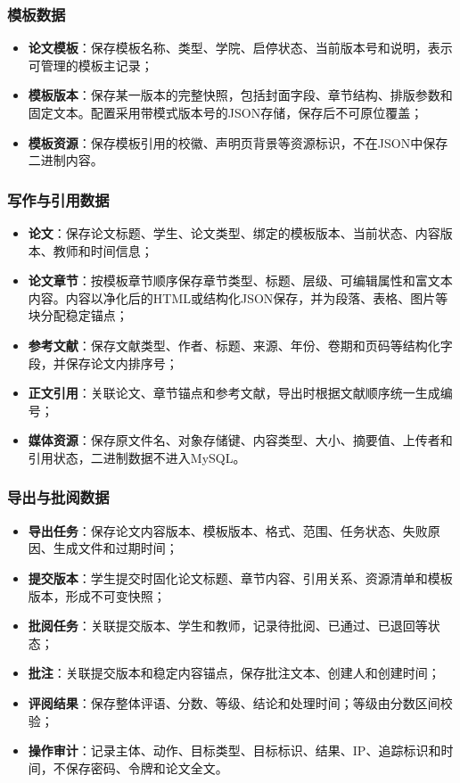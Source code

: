\documentclass{../template/softeng}
\begin{document}
	\subsubsection{模板数据}
	\begin{itemize}
		\item \textbf{论文模板}：保存模板名称、类型、学院、启停状态、当前版本号和说明，表示可管理的模板主记录；
		\item \textbf{模板版本}：保存某一版本的完整快照，包括封面字段、章节结构、排版参数和固定文本。配置采用带模式版本号的JSON存储，保存后不可原位覆盖；
		\item \textbf{模板资源}：保存模板引用的校徽、声明页背景等资源标识，不在JSON中保存二进制内容。
	\end{itemize}
	
	\subsubsection{写作与引用数据}
	\begin{itemize}
		\item \textbf{论文}：保存论文标题、学生、论文类型、绑定的模板版本、当前状态、内容版本、教师和时间信息；
		\item \textbf{论文章节}：按模板章节顺序保存章节类型、标题、层级、可编辑属性和富文本内容。内容以净化后的HTML或结构化JSON保存，并为段落、表格、图片等块分配稳定锚点；
		\item \textbf{参考文献}：保存文献类型、作者、标题、来源、年份、卷期和页码等结构化字段，并保存论文内排序号；
		\item \textbf{正文引用}：关联论文、章节锚点和参考文献，导出时根据文献顺序统一生成编号；
		\item \textbf{媒体资源}：保存原文件名、对象存储键、内容类型、大小、摘要值、上传者和引用状态，二进制数据不进入MySQL。
	\end{itemize}
	
	\subsubsection{导出与批阅数据}
	\begin{itemize}
		\item \textbf{导出任务}：保存论文内容版本、模板版本、格式、范围、任务状态、失败原因、生成文件和过期时间；
		\item \textbf{提交版本}：学生提交时固化论文标题、章节内容、引用关系、资源清单和模板版本，形成不可变快照；
		\item \textbf{批阅任务}：关联提交版本、学生和教师，记录待批阅、已通过、已退回等状态；
		\item \textbf{批注}：关联提交版本和稳定内容锚点，保存批注文本、创建人和创建时间；
		\item \textbf{评阅结果}：保存整体评语、分数、等级、结论和处理时间；等级由分数区间校验；
		\item \textbf{操作审计}：记录主体、动作、目标类型、目标标识、结果、IP、追踪标识和时间，不保存密码、令牌和论文全文。
	\end{itemize}
	
\end{document}
